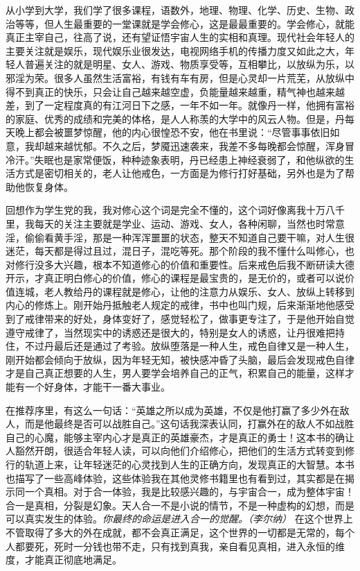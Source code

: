 从小学到大学，我们学了很多课程，语数外，地理、物理、化学、历史、生物、政治等等，但人生最重要的一堂课就是学会修心，这是最最重要的。学会修心，就能真正主宰自己，往高了说，还有望证悟宇宙人生的实相和真理。现代社会年轻人的主要关注就是娱乐，现代娱乐业很发达，电视网络手机的传播力度又如此之大，年轻人普遍关注的就是明星、女人、游戏、物质享受等，互相攀比，以放纵为乐，以邪淫为荣。很多人虽然生活富裕，有钱有车有房，但是心灵却一片荒芜，从放纵中得不到真正的快乐，只会让自己越来越空虚，负能量越来越重，精气神也越来越差，到了一定程度真的有江河日下之感，一年不如一年。就像丹一样，他拥有富裕的家庭、优秀的成绩和完美的体格，是人人称羡的大学中的风云人物。但是，丹每天晚上都会被噩梦惊醒，他的内心很惶恐不安，他在书里说：“尽管事事依旧如意，我却越来越忧郁。不久之后，梦魇迅速袭来，我差不多每晚都会惊醒，浑身冒冷汗。”失眠也是家常便饭，种种迹象表明，丹已经患上神经衰弱了，和他纵欲的生活方式是密切相关的，老人让他戒色，一方面是为修行打好基础，另外也是为了帮助他恢复身体。

回想作为学生党的我，我对修心这个词是完全不懂的，这个词好像离我十万八千里，我每天的关注主要就是学业、运动、游戏、女人，各种闲聊，当然也时常意淫，偷偷看黄手淫，那是一种浑浑噩噩的状态，整天不知道自己要干嘛，对人生很迷茫，每天都是得过且过，混日子，混吃等死。那个阶段的我不懂什么叫修心，也对修行没多大兴趣，根本不知道修心的价值和重要性。后来戒色后我不断研读大德开示，才真正明白修心的价值，修心的课程是最宝贵的，是无价的，或者可以说价值连城，老人教给丹的课程就是修心，让他的注意力从娱乐、女人、放纵上转移到内心的修炼上。刚开始丹抵触老人规定的戒律，书中也叫门规，后来渐渐地他感受到了戒律带来的好处，身体变好了，感觉轻松了，做事更专注了，于是他开始自觉遵守戒律了，当然现实中的诱惑还是很大的，特别是女人的诱惑，让丹很难把持住，不过丹最后还是通过了考验。放纵堕落是一种人生，戒色自律又是一种人生，刚开始都会倾向于放纵，因为年轻无知，被快感冲昏了头脑，最后会发现戒色自律才是自己真正想要的人生，男人要学会培养自己的正气，积累自己的能量，这样才能有一个好身体，才能干一番大事业。

在推荐序里，有这么一句话：“英雄之所以成为英雄，不仅是他打赢了多少外在敌人，而是他最终是否可以战胜自己。”这句话我深表认同，打赢外在的敌人不如战胜自己的心魔，能够主宰内心才是真正的英雄豪杰，才是真正的勇士！这本书的确让人豁然开朗，很适合年轻人读，可以向他们介绍修心，把他们的生活方式转变到修行的轨道上来，让年轻迷茫的心灵找到人生的正确方向，发现真正的大智慧。本书也描写了一些高峰体验，这些体验我在其他灵修书籍里也有看到过，其实都是在揭示同一个真相。对于合一体验，我是比较感兴趣的，与宇宙合一，成为整体宇宙！合一是真相，分裂是幻象。天人合一不是小说的情节，不是一种虚构的幻想，而是可以真实发生的体验。\textit{你最终的命运是进入合一的觉醒。（李尔纳）} 在这个世界上不管取得了多大的外在成就，都不会真正满足，这个世界的一切都是无常的，每个人都要死，死时一分钱也带不走，只有找到真我，亲自看见真相，进入永恒的维度，才能真正彻底地满足。

